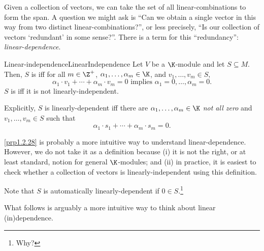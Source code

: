 Given a collection of vectors, we can take the set of all linear-combinations to form the span.  A question we might ask is ``Can we obtain a single vector in this way from two distinct linear-combinations?'', or less precisely, ``Is our collection of vectors `redundant' in some sense?''.  There is a term for this ``redundancy'':  \emph{linear-dependence}.
\begin{dfn}{Linear-independence}{LinearIndependence}
	Let $V$ be a $\K$-module and let $S\subseteq M$.  Then, $S$ is  iff for all $m\in \Z ^+$, $\alpha _1,\ldots ,\alpha _m\in \K$, and $v_1,\ldots ,v_m\in S$,
	\begin{equation}
	\alpha _1\cdot v_1+\cdots +\alpha _m\cdot v_m=0\text{ implies }\alpha _1=0,\ldots ,\alpha _m=0.
	\end{equation}
	$S$ is  iff it is not linearly-independent.
	\begin{rmk}
		Explicitly, $S$ is linearly-dependent iff there are $\alpha _1,\ldots ,\alpha _m\in \K$ \emph{not all zero} and $v_1,\ldots ,v_m\in S$ such that
		\begin{equation}
			\alpha _1\cdot s_1+\cdots +\alpha _m\cdot s_m=0.
		\end{equation}
	\end{rmk}
	\begin{rmk}
		\cref{prp1.2.28} is probably a more intuitive way to understand linear-dependence.  However, we do not take it as a definition because (i) it is not the right, or at least standard, notion for general $\K$-modules; and (ii) in practice, it is easiest to check whether a collection of vectors is linearly-independent using this definition.
	\end{rmk}
	\begin{rmk}
		Note that $S$ is automatically linearly-dependent if $0\in S$.\footnote{Why?}
	\end{rmk}
\end{dfn}
What follows is arguably a more intuitive way to think about linear (in)dependence.
